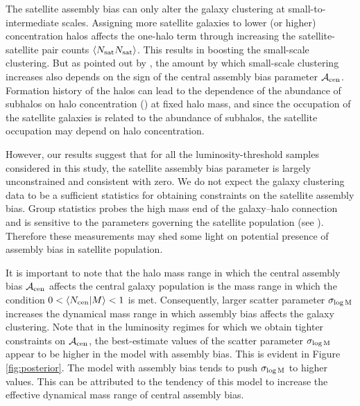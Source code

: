 \documentclass[12pt, preprint]{aastex}
\newcommand{\sigmam}{\sigma_{\log \rm M}}
\newcommand{\acen}{\mathcal{A}_{\rm cen}}
\begin{document}
The satellite assembly bias can only alter the galaxy clustering at small-to-intermediate scales. Assigning more satellite galaxies to lower (or higher) concentration halos affects the one-halo term through increasing the satellite-satellite pair counts $\langle N_{\rm sat} N_{\rm sat} \rangle$. This results in boosting the small-scale clustering. But as pointed out by \citet{decorated}, the amount by which small-scale clustering increases also depends on the sign of the central assembly bias parameter $\acen$. Formation history of the halos can lead to the dependence of the abundance of subhalos on halo concentration (\citealt{zentner2005, mao2015}) at fixed halo mass, and since the occupation of the satellite galaxies is related to the abundance of subhalos, the satellite occupation may depend on halo concentration. 

However, our results suggest that for all the luminosity-threshold samples considered in this study, the satellite assembly bias parameter is largely unconstrained and consistent with zero. We do not expect the galaxy clustering data to be a sufficient statistics for obtaining constraints on the satellite assembly bias. Group statistics probes the high mass end of the galaxy--halo connection and is sensitive to the parameters governing the satellite population (see \citealt{sham_gmf, 2016arXiv160701782H}). Therefore these measurements may shed some light on potential presence of assembly bias in satellite population.   

It is important to note that the halo mass range in which the central assembly bias $\acen$ affects the central galaxy population is the mass range in which the condition $0<\langle N_{\rm cen}|M \rangle<1$ is met. Consequently, larger scatter parameter $\sigmam$ increases the dynamical mass range in which assembly bias affects the galaxy clustering. Note that in the luminosity regimes for which we obtain tighter constraints on $\acen$, the best-estimate values of the scatter parameter $\sigmam$ appear to be higher in the model with assembly bias. This is evident in Figure \ref{fig:posterior}. The model with assembly bias tends to push $\sigmam$ to higher values. This can be attributed to the tendency of this model to increase the effective dynamical mass range of central assembly bias.
\end{document}
